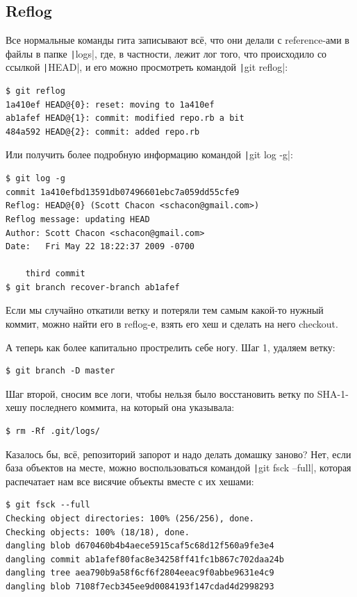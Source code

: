 \documentclass[a5paper]{article}
\begin{document}
\subsection{Reflog}

Все нормальные команды гита записывают всё, что они делали с reference-ами в файлы в папке \texttt|logs|, где, в частности, лежит лог того, что происходило со ссылкой \texttt|HEAD|, и его можно просмотреть командой \texttt|git reflog|:

\begin{verbatim}
$ git reflog
1a410ef HEAD@{0}: reset: moving to 1a410ef
ab1afef HEAD@{1}: commit: modified repo.rb a bit
484a592 HEAD@{2}: commit: added repo.rb
\end{verbatim}

Или получить более подробную информацию командой \texttt|git log -g|:

\begin{verbatim}
$ git log -g
commit 1a410efbd13591db07496601ebc7a059dd55cfe9
Reflog: HEAD@{0} (Scott Chacon <schacon@gmail.com>)
Reflog message: updating HEAD
Author: Scott Chacon <schacon@gmail.com>
Date:   Fri May 22 18:22:37 2009 -0700

    third commit
$ git branch recover-branch ab1afef
\end{verbatim}

Если мы случайно откатили ветку и потеряли тем самым какой-то нужный коммит, можно найти его в reflog-е, взять его хеш и сделать на него checkout.

А теперь как более капитально прострелить себе ногу. Шаг 1, удаляем ветку:

\begin{verbatim}
$ git branch -D master
\end{verbatim}

Шаг второй, сносим все логи, чтобы нельзя было восстановить ветку по SHA-1-хешу последнего коммита, на который она указывала:

\begin{verbatim}
$ rm -Rf .git/logs/
\end{verbatim}

Казалось бы, всё, репозиторий запорот и надо делать домашку заново? Нет, если база объектов на месте, можно воспользоваться командой \texttt|git fsck --full|, которая распечатает нам все висячие объекты вместе с их хешами:

\begin{verbatim}
$ git fsck --full
Checking object directories: 100% (256/256), done.
Checking objects: 100% (18/18), done.
dangling blob d670460b4b4aece5915caf5c68d12f560a9fe3e4
dangling commit ab1afef80fac8e34258ff41fc1b867c702daa24b
dangling tree aea790b9a58f6cf6f2804eeac9f0abbe9631e4c9
dangling blob 7108f7ecb345ee9d0084193f147cdad4d2998293
\end{verbatim}
\end{document}
